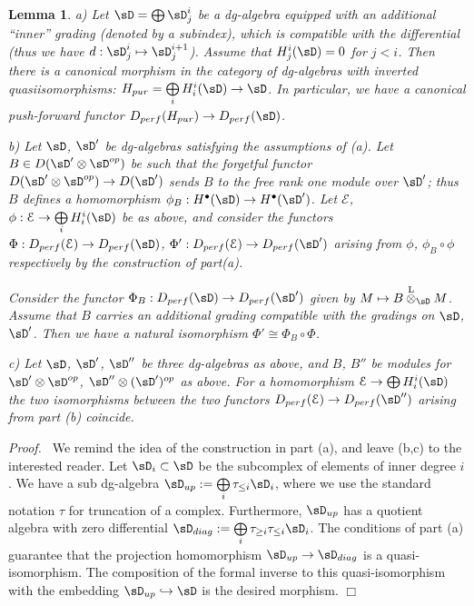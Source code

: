 \documentclass[11pt]{amsart}
\newtheorem{lem}{Lemma}
\theoremstyle{definition}
\theoremstyle{remark}
\theoremstyle{remark}
\newcommand{\bu}{\bullet}
\newcommand{\imbed}{\hookrightarrow}
\newcommand{\<}{\langle}
\renewcommand{\>}{\rangle}
\newcommand{\oplusl}{\bigoplus\limits}
\newcommand{\Lotimes}{\overset{\rm L}{\otimes}}
\newcommand{\Epur}{{\mathcal E}}
\begin{document}
\begin{lem}\label{gradualg}
a) Let $\sD=\oplusl \sD^i_j$ be a dg-algebra equipped with an additional ``inner'' grading
(denoted by a subindex), which is compatible with the differential (thus we have $d:\sD^i_j\mapsto
\sD^{i+1}_j$). Assume that $H^i_j(\sD)=0$ for $j<i$. Then there is a canonical morphism
in the category of dg-algebras with inverted quasiisomorphisms: $H_{pur}=\oplusl_i H^i_i(\sD) \to \sD$.
In particular, we have a canonical push-forward functor $D_{perf}(H_{pur})\to D_{perf}(\sD)$.

b) Let $\sD$, $\sD'$ be dg-algebras satisfying the assumptions 
of (a). Let $B\in D(\sD'\otimes \sD^{op})$ be such that the forgetful functor $D(\sD'\otimes \sD^{op})
\to D(\sD')$ sends $B$ to the free rank one module over $\sD'$; thus $B$ defines
a homomorphism $\phi_B:H^\bu(\sD)\to H^\bu(\sD')$. 
Let $\Epur$, $\phi:\Epur\to \oplusl_iH_i^i(\sD)$
be as above, and consider the functors $\Phi:D_{perf}(\Epur)\to D_{perf}(\sD)$,
$\Phi':D_{perf}(\Epur)\to D_{perf}(\sD')$ arising from $\phi$, $\phi_B\circ \phi$ respectively
by the construction of part(a).

 Consider the functor $\Phi_B:D_{perf}(\sD)\to D_{perf}(\sD')$ given by $M\mapsto B\Lotimes_\sD M$.
Assume that $B$ carries an additional grading compatible with the gradings on $\sD$, $\sD'$.
Then we have a natural isomorphism $\Phi'\cong \Phi_B\circ \Phi$.


c) Let $\sD$, $\sD'$, $\sD''$ be three dg-algebras as above, and $B$, $B''$ be modules
for $\sD'\otimes \sD^{op}$, $\sD''\otimes (\sD')^{op}$ as above. For a homomorphism
$\Epur \to \oplusl H^i_i(\sD)$ the two isomorphisms between the two functors 
$D_{perf}(\Epur)\to D_{perf}(\sD'')$ arising from part (b) coincide.
\end{lem}

{\em Proof.\ } We remind the idea of the construction in part (a), and leave (b,c) to the interested
reader. Let $\sD_i\subset \sD$ be the subcomplex of elements of inner
degree $i$. We have a sub dg-algebra 
$\sD_{up}:= \oplusl_i \tau_{\leq i} \sD_i$, where
we use the standard notation $\tau$ for truncation of a complex.
Furthermore, $\sD_{up}$ has a quotient algebra with zero differential
$\sD_{diag}:=\oplusl_i \tau_{\geq i}\tau_{\leq i} \sD_i$. 
The conditions of part (a) guarantee
that the projection homomorphism $\sD_{up}\to \sD_{diag}$ is a quasi-isomorphism. The composition
of the formal inverse to this quasi-isomorphism 
with the embedding $\sD_{up}\imbed \sD$
is the desired morphism. \hfill $\Box$
\end{document}
